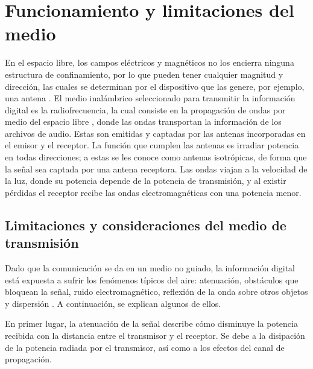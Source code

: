 

\section{Funcionamiento y limitaciones del medio}

En el espacio libre, los campos eléctricos y magnéticos no los encierra ninguna estructura de confinamiento, por lo que pueden tener cualquier magnitud y dirección, las cuales se determinan por el dispositivo que las genere, por ejemplo, una antena \cite{Hyatt}.
El medio inalámbrico seleccionado para transmitir la información digital es la radiofrecuencia, la cual consiste en la propagación de ondas por medio del espacio libre \cite{Hyatt}, donde las ondas transportan la información de los archivos de audio.
Estas son emitidas y captadas por las antenas incorporadas en el emisor y el receptor.
La función que cumplen las antenas es irradiar potencia en todas direcciones; a estas se les conoce como antenas isotrópicas, de forma que la señal sea captada por una antena receptora.
Las ondas viajan a la velocidad de la luz, donde su potencia depende de la potencia de transmisión, y al existir pérdidas el receptor recibe las ondas electromagnéticas con una potencia menor.

\subsection{Limitaciones y consideraciones del medio de transmisión}

Dado que la comunicación se da en un medio no guiado, la información digital está expuesta a sufrir los fenómenos típicos del aire: atenuación, obstáculos que bloquean la señal, ruido electromagnético, reflexión de la onda sobre otros objetos y dispersión \cite{wireless}.
A continuación, se explican algunos de ellos.

En primer lugar, la atenuación de la señal describe cómo disminuye la potencia recibida con la distancia entre el transmisor y el receptor.
Se debe a la disipación de la potencia radiada por el transmisor, así como a los efectos del canal de propagación.

